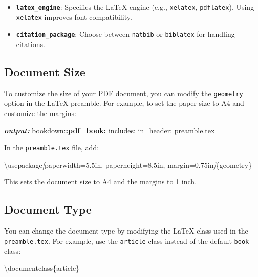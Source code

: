 \documentclass[
]{book}
\newenvironment{Shaded}{\begin{snugshade}}{\end{snugshade}}
\newcommand{\AnnotationTok}[1]{\textcolor[rgb]{0.56,0.35,0.01}{\textbf{\textit{#1}}}}
\newcommand{\CommentTok}[1]{\textcolor[rgb]{0.56,0.35,0.01}{\textit{#1}}}
\newcommand{\NormalTok}[1]{#1}
\newcommand{\OtherTok}[1]{\textcolor[rgb]{0.56,0.35,0.01}{#1}}
\newcommand{\SpecialCharTok}[1]{\textcolor[rgb]{0.81,0.36,0.00}{\textbf{#1}}}
\providecommand{\tightlist}{%
  \setlength{\itemsep}{0pt}\setlength{\parskip}{0pt}}
\theoremstyle{definition}
\theoremstyle{definition}
\theoremstyle{definition}
\theoremstyle{definition}
\theoremstyle{remark}
\begin{document}
\begin{itemize}
\tightlist
\item
  \textbf{\texttt{latex\_engine}}: Specifies the LaTeX engine (e.g., \texttt{xelatex}, \texttt{pdflatex}). Using \texttt{xelatex} improves font compatibility.
\item
  \textbf{\texttt{citation\_package}}: Choose between \texttt{natbib} or \texttt{biblatex} for handling citations.
\end{itemize}

\subsection{Document Size}\label{document-size}

To customize the size of your PDF document, you can modify the \texttt{geometry} option in the LaTeX preamble. For example, to set the paper size to A4 and customize the margins:

\begin{Shaded}
\begin{Highlighting}[]
\AnnotationTok{output:}
\NormalTok{  bookdown:}\SpecialCharTok{:pdf\_book:}
\NormalTok{    includes:}
\NormalTok{      in\_header: preamble.tex}
\end{Highlighting}
\end{Shaded}

In the \texttt{preamble.tex} file, add:

\begin{Shaded}
\begin{Highlighting}[]
\NormalTok{\textbackslash{}usepackage}\CommentTok{[}\OtherTok{paperwidth=5.5in, paperheight=8.5in, margin=0.75in}\CommentTok{]}\NormalTok{\{geometry\}}
\end{Highlighting}
\end{Shaded}

This sets the document size to A4 and the margins to 1 inch.

\subsection{Document Type}\label{document-type}

You can change the document type by modifying the LaTeX class used in the \texttt{preamble.tex}. For example, use the \texttt{article} class instead of the default \texttt{book} class:

\begin{Shaded}
\begin{Highlighting}[]
\NormalTok{\textbackslash{}documentclass\{article\}}
\end{Highlighting}
\end{Shaded}
\end{document}
